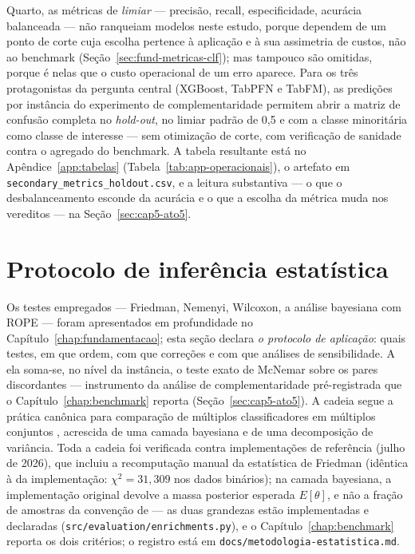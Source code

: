 Quarto, as métricas de \emph{limiar} --- precisão, recall, especificidade,
acurácia balanceada --- não ranqueiam modelos neste estudo, porque
dependem de um ponto de corte cuja escolha pertence à aplicação e à sua
assimetria de custos, não ao benchmark
(Seção~\ref{sec:fund-metricas-clf}); mas tampouco são omitidas, porque é
nelas que o custo operacional de um erro aparece. Para os três
protagonistas da pergunta central (XGBoost, TabPFN e TabFM), as predições
por instância do experimento de complementaridade permitem abrir a matriz
de confusão completa no \emph{hold-out}, no limiar padrão de 0,5 e com a
classe minoritária como classe de interesse --- sem otimização de corte,
com verificação de sanidade contra o agregado do benchmark. A tabela resultante
está no Apêndice~\ref{app:tabelas} (Tabela~\ref{tab:app-operacionais}), o
artefato em \texttt{secondary\_\allowbreak metrics\_\allowbreak holdout.csv}, e a leitura
substantiva --- o que o desbalanceamento esconde da acurácia e o que a
escolha da métrica muda nos vereditos --- na Seção~\ref{sec:cap5-ato5}.

\section{Protocolo de inferência estatística}
\label{sec:met-estatistica}

Os testes empregados --- Friedman, Nemenyi, Wilcoxon, a análise bayesiana
com ROPE --- foram apresentados em profundidade no
Capítulo~\ref{chap:fundamentacao}; esta seção declara \emph{o protocolo de
aplicação}: quais testes, em que ordem, com que correções e com que análises
de sensibilidade. A ela soma-se, no nível da instância, o teste exato de
McNemar sobre os pares discordantes \citep{mcnemar1947} --- instrumento da
análise de complementaridade pré-registrada que o
Capítulo~\ref{chap:benchmark} reporta (Seção~\ref{sec:cap5-ato5}). A cadeia segue a prática canônica para comparação de
múltiplos classificadores em múltiplos conjuntos \citep{demsar2006,
benavoli2017}, acrescida de uma camada bayesiana e de uma decomposição de
variância. Toda a cadeia foi verificada contra implementações de
referência (julho de
2026), que incluiu a recomputação manual da estatística de Friedman
(idêntica à da implementação: $\chi^2 = 31{,}309$ nos dados binários);
na camada bayesiana, a implementação original devolve a massa
posterior esperada $E[\theta]$, e não a
fração de amostras da convenção de \citet{benavoli2017} --- as duas
grandezas estão implementadas e declaradas
(\texttt{src/evaluation/enrichments.py}), e o Capítulo~\ref{chap:benchmark}
reporta os dois critérios; o registro está em
\texttt{docs/\allowbreak metodologia-\allowbreak estatistica.\allowbreak md}.

